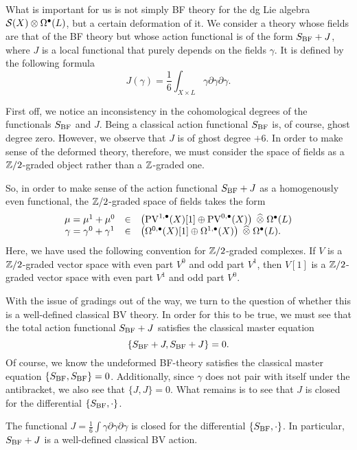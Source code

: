 \documentclass[11pt]{amsart}
\def\pv{{\rm PV}}
\begin{document}
What is important for us is not simply BF theory for the dg Lie algebra $\mathcal S(X) \otimes \Omega^\bullet(L)$, but a certain deformation of it.
We consider a theory whose fields are that of the BF theory but whose action functional is of the form $S_{\rm BF} + J$, where $J$ is a local functional that purely depends on the fields $\gamma$.
It is defined by the following formula
\[
J(\gamma) = \frac16 \int_{X\times L} \gamma \partial \gamma \partial \gamma .
\]

First off, we notice an inconsistency in the cohomological degrees of the functionals $S_{\rm BF}$ and $J$.
Being a classical action functional $S_{\rm BF}$ is, of course, ghost degree zero.
However, we observe that $J$ is of ghost degree $+6$.
In order to make sense of the deformed theory, therefore, we must consider the space of fields as a $\mathbb Z/2$-graded object rather than a $\mathbb Z$-graded one.

So, in order to make sense of the action functional $S_{\rm BF} + J$ as a homogenously even functional, the $\mathbb Z /2$-graded space of fields takes the form
\[
  \begin{array}{ccl}
    \mu = \mu^1+\mu^0 & \in & \left(\pv^{1,\bu}(X)[1] \oplus \pv^{0,\bu}(X) \right) \; \Hat{\otimes} \; \Omega^{\bu}(L) \\
    \gamma = \gamma^0+ \gamma^1 & \in & \left(\Omega^{0,\bu}(X)[1] \oplus \Omega^{1,\bu}(X) \right) \; \Hat{\otimes}\; \Omega^{\bu}(L) .
  \end{array}
\]
Here, we have used the following convention for $\mathbb Z/2$-graded complexes.
If $V$ is a $\mathbb Z/2$-graded vector space with even part $V^0$ and odd part $V^1$, then $V[1]$ is a $\mathbb Z/2$-graded vector space with even part $V^1$ and odd part $V^0$.

With the issue of gradings out of the way, we turn to the question of whether this is a well-defined classical BV theory.
In order for this to be true, we must see that the total action functional $S_{\rm BF} + J$ satisfies the classical master equation
\[
  \{S_{\rm BF} + J , S_{\rm BF} + J\} = 0 .
\]
Of course, we know the undeformed BF-theory satisfies the classical master equation $\{S_{\rm BF}, S_{\rm BF}\} = 0$.
Additionally, since $\gamma$ does not pair with itself under the antibracket, we also see that $\{J,J\}=0$.
What remains is to see that $J$ is closed for the differential $\{S_{\rm BF}, \cdot\}$.

\begin{lem}
The functional $J = \frac16\int \gamma \partial \gamma \partial \gamma$ is closed for the differential $\{S_{\rm BF},\cdot\}$.
In particular, $S_{\rm BF} + J$ is a well-defined classical BV action.
\end{lem}
\end{document}
